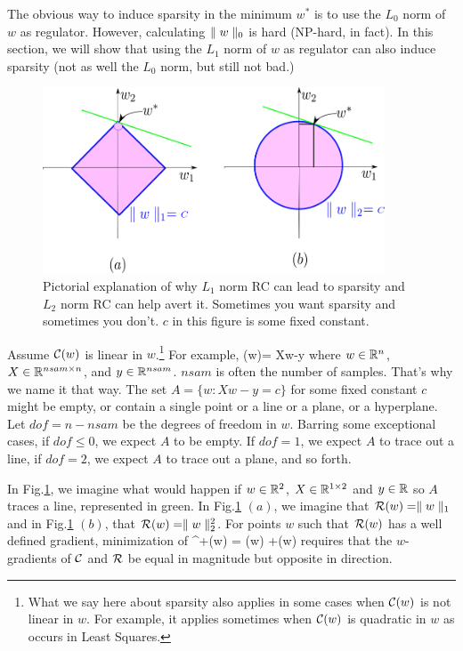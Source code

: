 The obvious way to induce sparsity in 
the minimum $w^*$ is to use the $L_0$ norm of $w$ as regulator.
However, calculating $\parallel w\parallel_0$ is
hard (NP-hard, in fact). In this section, we will
show that using the $L_1$ norm
of $w$ as regulator can also induce sparsity (not as well the
$L_0$ norm, but still not bad.)
\begin{figure}[h!]
\centering
\includegraphics[width=4in]
{regularization/sparsity.png}
\caption{Pictorial explanation of
why $L_1$ norm RC can lead to sparsity
and $L_2$ norm RC can help avert it. Sometimes 
you want sparsity and sometimes you don't. $c$ in this figure is some 
fixed constant.
}
\label{fig-sparsity}
\end{figure}

Assume ${\cal C}(w)$ is linear in $w$.\footnote{What we say here about sparsity also applies in some cases when ${\cal C}(w)$ is not linear in $w$. For example, it applies sometimes when ${\cal C}(w)$
is quadratic in $w$ as occurs in Least Squares.}
For example, 
\beq
\calc(w)= Xw-y
\eeq
where $w\in{ \mathbb{R}}^n$, $X\in { \mathbb{R}}^{nsam\times n}$,  and $y\in{ \mathbb{R}}^{nsam}$.
$nsam$ is often the number of samples. That's why we name it that way.
The set $A=\{w: Xw-y=c\}$ for some fixed constant $c$  might be empty,
or contain a single point or a line or a plane, or a hyperplane. Let $dof=n-nsam$
be the degrees  of freedom in $w$.
Barring some exceptional cases, if $dof\leq 0$, we expect $A$ to be empty.
If $dof=1$, we expect $A$ to trace out a line, if $dof= 2$, we expect $A$ to
trace out a plane, and so forth.

In Fig.\ref{fig-sparsity}, we imagine
what would happen if
$w\in { \mathbb{R}}^2$, $X\in { \mathbb{R}}^{1\times 2}$
and $y\in { \mathbb{R}}$ so $A$ traces a line,
represented in green.
In Fig.\ref{fig-sparsity} $(a)$,
we imagine that ${\cal R}(w)=\parallel w\parallel_1$
and in Fig.\ref{fig-sparsity} $(b)$, that
${\cal R}(w)=\parallel w\parallel_2^2$.
For points $w$ such that ${\cal R}(w)$
has a well defined gradient, 
minimization of 
\beq
\calc^+(w) = \calc(w) +\calr(w)
\eeq
requires that the $w$-gradients of
${\cal C}$ and ${\cal R}$ be equal in magnitude but opposite in direction.

